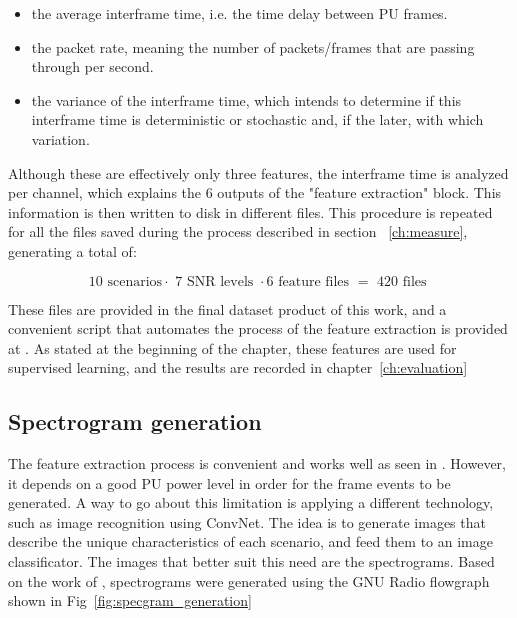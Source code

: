 \begin{itemize}
    \item the average interframe time, i.e. the time delay between \ac{PU} frames.
    \item the packet rate, meaning the number of packets/frames that are passing through per second.
    \item the variance of the interframe time, which intends to determine if this interframe time is deterministic or stochastic and, if the later, with which variation.
\end{itemize}

Although these are effectively only three features, the interframe time is analyzed per channel, which explains the 6 outputs of the "feature extraction" block. This information is then written to disk in different files. This procedure is repeated for all the files saved during the process described in section ~\ref{ch:measure}, generating a total of:

\begin{equation}
    \text{10 scenarios} \cdot \text{ 7 SNR levels } \cdot \text{6 feature files } = \text{ 420 files }
\end{equation}

These files are provided in the final dataset product of this work, and a convenient script that automates the process of the feature extraction is provided at \cite{repo:cognitive_radio_ml}. As stated at the beginning of the chapter, these features are used for supervised learning, and the results are recorded in chapter~\ref{ch:evaluation}

\subsection{Spectrogram generation}\label{ch:spectrogram}

The feature extraction process is convenient and works well as seen in \cite{Wunsch2017}. However, it depends on a good \ac{PU} power level in order for the frame events to be generated. A way to go about this limitation is applying a different technology, such as image recognition using \ac{ConvNet}. The idea is to generate images that describe the unique characteristics of each scenario, and feed them to an image classificator. The images that better suit this need are the spectrograms. Based on the work of \cite{Paisana2017}, spectrograms were generated using the GNU Radio flowgraph shown in Fig~\ref{fig:specgram_generation}

